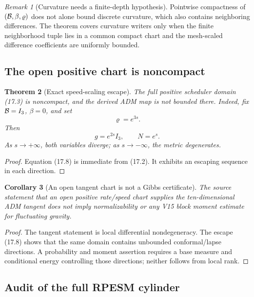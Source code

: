 \documentclass[11pt]{article}
\newtheorem{theorem}{Theorem}[section]
\newtheorem{corollary}[theorem]{Corollary}
\theoremstyle{remark}
\newtheorem{remark}[theorem]{Remark}
\begin{document}
\begin{remark}[Curvature needs a finite-depth hypothesis]
\label{rem:v17v17-curvature}
Pointwise compactness of \(({\cal B},\beta,\varrho)\) does not alone
bound discrete curvature, which also contains neighboring
differences.  The theorem covers curvature writers only when the
finite neighborhood tuple lies in a common compact chart and the
mesh-scaled difference coefficients are uniformly bounded.
\end{remark}

\subsection{The open positive chart is noncompact}

\begin{theorem}[Exact speed-scaling escape]
\label{thm:v17v17-escape}
The full positive scheduler domain (17.3) is noncompact, and the
derived ADM map is not bounded there.  Indeed, fix
\({\cal B}=I_3\), \(\beta=0\), and set
\[
 \varrho=e^{3s}.
\]
Then
\[
 g=e^{2s}I_3,\qquad N=e^s.                         \tag{17.8}
\]
As \(s\to+\infty\), both variables diverge; as
\(s\to-\infty\), the metric degenerates.
\end{theorem}

\begin{proof}
Equation (17.8) is immediate from (17.2).  It exhibits an escaping
sequence in each direction.
\end{proof}

\begin{corollary}[An open tangent chart is not a Gibbs certificate]
\label{cor:v17v17-open-not-certificate}
The source statement that an open positive rate/speed chart
supplies the ten-dimensional ADM tangent does not imply
normalizability or any V15 block moment estimate for fluctuating
gravity.
\end{corollary}

\begin{proof}
The tangent statement is local differential nondegeneracy.
The escape (17.8) shows that the same domain contains unbounded
conformal/lapse directions.  A probability and moment assertion
requires a base measure and conditional energy controlling those
directions; neither follows from local rank.
\end{proof}

\subsection{Audit of the full RPESM cylinder}
\end{document}
